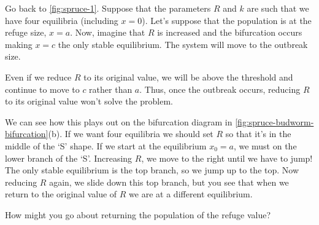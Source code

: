 \documentclass[main.tex]{subfiles}
\begin{document}
Go back to \cref{fig:spruce-1}. Suppose that the parameters $R$ and $k$ are such that we have four equilibria (including $x = 0$). Let’s suppose that the population is at the refuge size, $x = a$. Now, imagine that $R$ is increased and the bifurcation occurs making $x=c$ the only stable equilibrium. The system will move to the outbreak size. 

Even if we reduce $R$ to its original value, we will be above the threshold and continue to move to $c$ rather than $a$. Thus, once the outbreak occurs, reducing $R$ to its original value won’t solve the problem. 

\label{para:discussion-on-jumps}We can see how this plays out on the bifurcation diagram in \cref{fig:spruce-budworm-bifurcation}(b). If we want four equilibria we should set $R$ so that it's in the middle of the `S' shape. If we start at the equilibrium $x_0=a$, we must on the lower branch of the `S'. Increasing $R$, we move to the right until we have to jump! The only stable equilibrium is the top branch, so we jump up to the top. Now reducing $R$ again, we slide down this top branch, but you see that when we return to the original value of $R$ we are at a different equilibrium.

\begin{do-it-yourself}
How might you go about returning the population of the refuge value?
\end{do-it-yourself}
\end{document}
